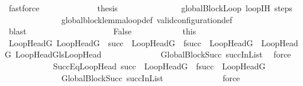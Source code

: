 \begin{isabellebody}
\ fastforce\isanewline
\ \ \ \ \ \ \ \ \ \ \isamarkupfalse%
\ \isamarkupfalse%
\ {\isacharquery}{\kern0pt}thesis\ \isanewline
\ \ \ \ \ \ \ \ \ \ \ \ \isamarkupfalse%
\ globalBlockLoop\ loopIH\ steps\isanewline
\ \ \ \ \ \ \ \ \ \ \ \ \isamarkupfalse%
\ global{\isacharunderscore}{\kern0pt}block{\isacharunderscore}{\kern0pt}lemma{\isacharunderscore}{\kern0pt}loop{\isacharunderscore}{\kern0pt}def\ valid{\isacharunderscore}{\kern0pt}configuration{\isacharunderscore}{\kern0pt}def\isanewline
\ \ \ \ \ \ \ \ \ \ \ \ \isamarkupfalse%
\ blast\isanewline
\ \ \ \ \ \ \ \ \isamarkupfalse%
\isanewline
\ \ \ \ \ \ \ \ \ \ \isamarkupfalse%
\ False\isanewline
\ \ \ \ \ \ \ \ \ \ \isamarkupfalse%
\ this\ \isamarkupfalse%
\ LoopHeadG\ LoopHeadG{\isacharprime}{\kern0pt}\ \ {\isachardoublequoteopen}succ\ {\isacharequal}{\kern0pt}\ LoopHeadG\ {\isasymand}\ f{\isacharparenleft}{\kern0pt}succ{\isacharparenright}{\kern0pt}\ {\isacharequal}{\kern0pt}\ LoopHeadG{\isacharprime}{\kern0pt}{\isachardoublequoteclose}\ \ {\isachardoublequoteopen}{\isacharparenleft}{\kern0pt}LoopHeadG{\isacharcomma}{\kern0pt}\ LoopHeadG{\isacharprime}{\kern0pt}{\isacharparenright}{\kern0pt}{\isasymin}lsLoopHead{\isachardoublequoteclose}\isanewline
\ \ \ \ \ \ \ \ \ \ \ \ \isamarkupfalse%
\ GlobalBlockSucc\ succInList\ \isamarkupfalse%
\ force\isanewline
\ \ \ \ \ \ \ \ \ \ \isamarkupfalse%
\ SuccEqLoopHead{\isacharcolon}{\kern0pt}\ {\isachardoublequoteopen}succ\ {\isacharequal}{\kern0pt}\ LoopHeadG\ {\isasymand}\ f{\isacharparenleft}{\kern0pt}succ{\isacharparenright}{\kern0pt}\ {\isacharequal}{\kern0pt}\ LoopHeadG{\isacharprime}{\kern0pt}{\isachardoublequoteclose}\isanewline
\ \ \ \ \ \ \ \ \ \ \ \ \isamarkupfalse%
\ GlobalBlockSucc\ succInList\isanewline
\ \ \ \ \ \ \ \ \ \ \ \ \isamarkupfalse%
\ force\isanewline
\isanewline
\ \ \ \ \ \ \ \ \ \ \isamarkupfalse%

\end{isabellebody}
